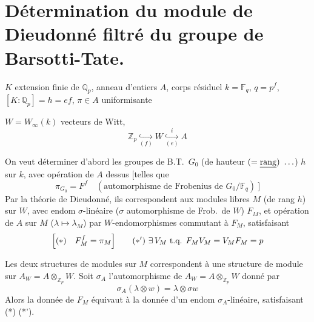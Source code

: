 \documentclass[11pt,a4paper]{article}
\begin{document}

\section*{Détermination du module de Dieudonné filtré du groupe de
Barsotti-Tate.}

$K$ extension finie de $\mathbb{Q}_p$, anneau d'entiers $A$, corps résiduel
$k = \mathbb{F}_q$, $q = p^f$, $[K : \mathbb{Q}_p] = h = ef$,
$\pi \in A$ uniformisante


$W = W_\infty(k)$ vecteurs de Witt,
\[
\mathbb{Z}_p \underset{(f)}{\hookrightarrow} W \underset{(e)}{\overset{i}{\hookrightarrow}} A
\]

On veut déterminer d'abord les groupes de B.T.\ $G_0$ (de hauteur
$(= \uncertain{\mathrm{rang}})\ \ldots$) 
$h$ sur \struck{\ill{}} $k$, avec opération de $A$ dessus [telles que
\[
\pi_{G_0} = F^f \quad (\text{automorphisme de Frobenius de } G_0/\mathbb{F}_q)\ ]
\]
Par la théorie de Dieudonné, ils correspondent aux modules libres $M$ (de
rang $h$) sur $W$, avec endom $\sigma$-linéaire ($\sigma$ automorphisme de
Frob.\ de $W$) $F_M$, et opération de $A$ sur $M$ ($\lambda \mapsto
\lambda_M$) par $W$-endomorphismes commutant à $F_M$, satisfaisant
\[
\Bigl[ (*) \quad F_M^f = \pi_M \Bigr]
\qquad (*')\ \exists\, V_M \text{ t.q. } F_M V_M = V_M F_M = p
\]


Les deux structures de modules sur $M$ correspondent à une structure de module
sur $A_W = A \otimes_{\mathbb{Z}_p} W$. Soit \struck{\ill{}} $\sigma_A$
l'automorphisme de $A_W = A \otimes_{\mathbb{Z}_p} W$ donné par
\[
\sigma_A(\lambda \otimes w) = \lambda \otimes \sigma w
\]
Alors la donnée de $F_M$ équivaut à la donnée d'un endom $\sigma_A$-linéaire,
satisfaisant (*) (*').
\end{document}
